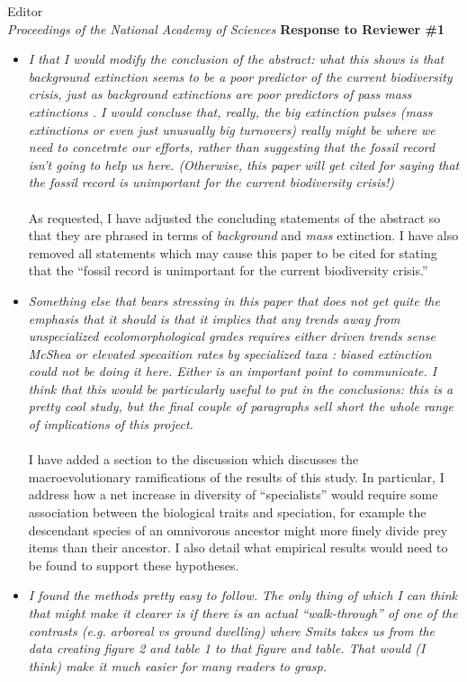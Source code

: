 \documentclass{letter}
\begin{document}
\begin{letter}{Editor \\ \textit{Proceedings of the National Academy of Sciences}}
  \textbf{Response to Reviewer \#1}
  \begin{itemize}
    \item \textit{I that I would modify the conclusion of the abstract: what this shows is that background extinction seems to be a poor predictor of the current biodiversity crisis, just as background extinctions are poor predictors of pass mass extinctions \cite{Jablonski1986}. I would concluse that, really, the big extinction pulses (mass extinctions or even just unusually big turnovers) really might be where we need to concetrate our efforts, rather than suggesting  that the fossil record isn't going to help us here. (Otherwise, this paper will get cited for saying that the fossil record is unimportant for the current biodiversity crisis!)} 
      \\\\As requested, I have adjusted the concluding statements of the abstract so that they are phrased in terms of \textit{background} and \textit{mass} extinction. I have also removed all statements which may cause this paper to be cited for stating that the ``fossil record is unimportant for the current biodiversity crisis.''
    \item \textit{Something else that bears stressing in this paper that does not get quite the emphasis that it should is that it implies that any trends away from unspecialized ecolomorphological grades requires either driven trends sense McShea \cite{McShea1994a} or elevated specaition rates by specialized taxa \cite{Stanley1975}: biased extinction could not be doing it here. Either is an important point to communicate. I think that this would be particularly useful to put in the conclusions: this is a pretty cool study, but the final couple of paragraphs sell short the whole range of implications of this project.}
      \\\\I have added a section to the discussion which discusses the macroevolutionary ramifications of the results of this study. In particular, I address how a net increase in diversity of ``specialists'' would require some association between the biological traits and speciation, for example the descendant species of an omnivorous ancestor might more finely divide prey items than their ancestor. I also detail what empirical results would need to be found to support these hypotheses.
    \item \textit{I found the methods pretty easy to follow. The only thing of which I can think that might make it clearer is if there is an actual ``walk-through'' of one of the contrasts (e.g. arboreal vs ground dwelling) where Smits takes us from the data creating figure 2 and table 1 to that figure and table. That would (I think) make it much easier for many readers to grasp.}

\end{itemize}
\end{letter}
\end{document}

